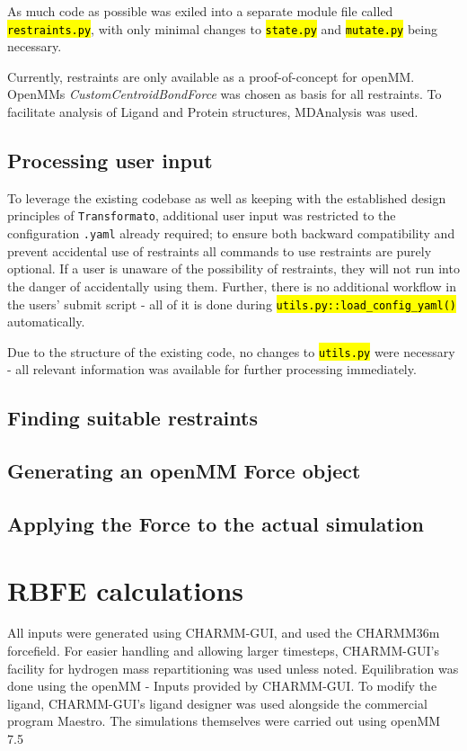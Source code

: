 \documentclass[oneside]{scrreprt}
\newcommand{\code}[1]{\texttt{\hl{#1}}}
\begin{document}
 As much code as possible was exiled into a separate module file called \code{restraints.py}, with only minimal changes to \code{state.py} and \code{mutate.py} being necessary. 

Currently, restraints are only available as a proof-of-concept for openMM. OpenMMs \emph{CustomCentroidBondForce} was chosen as basis for all restraints. To facilitate analysis of Ligand and Protein structures, MDAnalysis\cite{agrawal2011,oliver_beckstein-proc-scipy-2016} was used.

\subsection{Processing user input}
To leverage the existing codebase as well as keeping with the established design principles of \texttt{Transformato}, additional user input was restricted to the configuration \texttt{.yaml} already required; to ensure both backward compatibility and prevent accidental use of restraints all commands to use restraints are purely optional. If a user is unaware of the possibility of restraints, they will not run into the danger of accidentally using them. Further, there is no additional workflow in the users' submit script - all of it is done during \code{utils.py::load\_config\_yaml()} automatically.

Due to the structure of the existing code, no changes to \code{utils.py} were necessary - all relevant information was available for further processing immediately.
\subsection{Finding suitable restraints}

\subsection{Generating an openMM Force object}

\subsection{Applying the Force to the actual simulation}
\section{RBFE calculations}
All inputs were generated using CHARMM-GUI\cite{Jo2008Aug}, and used the CHARMM36m forcefield\cite{Huang2017Jan}. For easier handling and allowing larger timesteps, CHARMM-GUI's facility for hydrogen mass repartitioning\cite{Gao2021Feb} was used unless noted. Equilibration was done using the openMM - Inputs provided by CHARMM-GUI\cite{Brooks2009Jul,Lee2016Jan}. To modify the ligand, CHARMM-GUI's ligand designer\cite{Guterres2021Nov} was used alongside the commercial program Maestro\cite{maestro}. The simulations themselves were carried out using openMM 7.5\cite{Eastman2017Jul}
\end{document}
